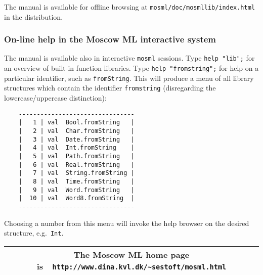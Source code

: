 \documentclass[fleqn,twoside,a4paper]{article}
\begin{document}
The manual is available for offline browsing at
\verb$mosml/doc/mosmllib/index.html$ in the distribution.

\subsubsection*{On-line help in the Moscow ML interactive system}

The manual is available also in interactive {\tt mosml} sessions.
Type {\tt help "lib";} for an overview of built-in function libraries.
Type {\tt help "fromstring";} for help on a particular identifier,
such as {\tt fromString}.  This will produce a menu of all library
structures which contain the identifier {\tt fromstring} (disregarding
the lowercase/uppercase distinction):

{\small\begin{verbatim}
    --------------------------------
    |   1 | val  Bool.fromString   |
    |   2 | val  Char.fromString   |
    |   3 | val  Date.fromString   |
    |   4 | val  Int.fromString    |
    |   5 | val  Path.fromString   |
    |   6 | val  Real.fromString   |
    |   7 | val  String.fromString |
    |   8 | val  Time.fromString   |
    |   9 | val  Word.fromString   |
    |  10 | val  Word8.fromString  |
    --------------------------------
\end{verbatim}}

\noindent Choosing a number from this menu will invoke the help
browser on the desired structure, e.g.\ {\tt Int}.  

\vfill

\begin{center}
\begin{tabular}{|c|}\hline
\rule[-0.4cm]{0cm}{1cm}The Moscow ML home page is\ \
    \verb$http://www.dina.kvl.dk/~sestoft/mosml.html$\\\hline
\end{tabular}
\end{center}

\newpage

\setcounter{page}{1}

\twocolumn
{\setlength{\parindent}{0cm}
\renewcommand{\contentsline}[3]{#2\hfill #3\hspace*{3em}\newline}
\tableofcontents
}
\onecolumn

\newpage 



\newpage


\end{document}
